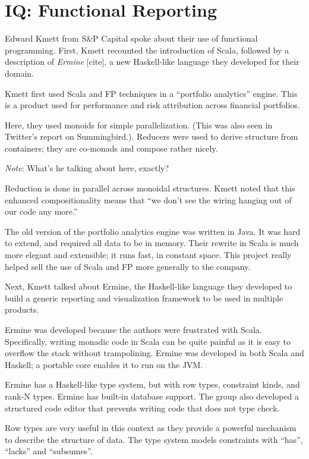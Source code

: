 \documentclass{jfp1}
\newenvironment{ipar}[0]%
 {\begin{list}{}%
 {\setlength{\leftmargin}{1cm}}%
\item[]%
 }
 {\end{list}}
\newcommand\needcite{{\color{red} [cite]}\xspace}
\newcommand{\note}[1]{ \begin{ipar}  {\color{Gray} \textit{Note}: #1} \end{ipar}}
\begin{document}
\section{IQ: Functional Reporting}


Edward Kmett from S\&P Capital spoke about their use of functional
programming. First, Kmett recounted the introduction of Scala, followed by a
description of \textit{Ermine}\needcite, a new Haskell-like  language they
developed for their domain.

Kmett first used Scala and FP techniques in a ``portfolio analytics''
engine. This is a product used for performance and risk attribution
across financial portfolios.

Here, they used monoids for simple parallelization. (This was also
seen in Twitter's report on Summingbird.). Reducers were used to
derive structure from containers; they are co-monads and compose
rather nicely. \note{What's he talking about here, exactly?} Reduction
is done in parallel across monoidal structures. Kmett noted that this
enhanced compositionality means that ``we don't see the wiring hanging
out of our code any more.''

The old version of the portfolio analytics engine was written in Java.
It was hard to extend, and required all data to be in memory. Their
rewrite in Scala is much more elegant and extensible; it runs fast, in
constant space. This project really helped sell the use of Scala and
FP more generally to the company.

Next, Kmett talked about Ermine, the Haskell-like language they
developed to build a generic reporting and visualization framework to
be used in multiple products.

Ermine was developed because the authors were frustrated with Scala.
Specifically, writing monadic code in Scala can be quite painful as it
is easy to overflow the stack without trampolining. Ermine was developed
in both Scala and Haskell; a portable core enables it to run on the
JVM.

Ermine has a Haskell-like type system, but with row types, constraint
kinds, and rank-N types. Ermine has built-in database support. The
group also developed a structured code editor that prevents writing
code that does not type check.

Row types are very useful in this context as they provide a powerful mechanism
to describe the structure of data. The type system models constraints
with ``has'', ``lacks'' and ``subsumes''.
\end{document}
